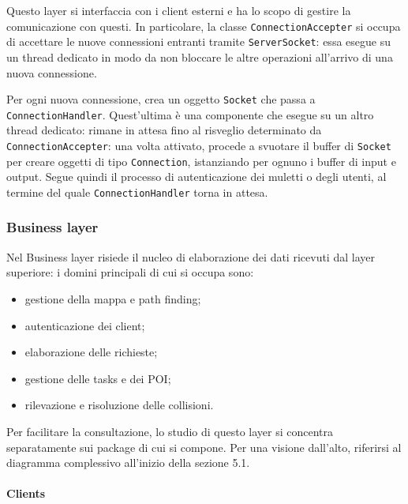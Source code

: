 Questo layer si interfaccia con i client esterni e ha lo scopo di gestire la comunicazione con questi. In particolare, la classe \texttt{ConnectionAccepter} si occupa di accettare le nuove connessioni entranti tramite \texttt{ServerSocket}: essa esegue su un thread dedicato in modo da non bloccare le altre operazioni all'arrivo di una nuova connessione.

Per ogni nuova connessione, crea un oggetto \texttt{Socket} che passa a \texttt{ConnectionHandler}. Quest'ultima è una componente che esegue su un altro thread dedicato: rimane in attesa fino al risveglio determinato da \texttt{ConnectionAccepter}: una volta attivato, procede a svuotare il buffer di \texttt{Socket} per creare oggetti di tipo \texttt{Connection}, istanziando per ognuno i buffer di input e output. Segue quindi il processo di autenticazione dei muletti o degli utenti, al termine del quale \texttt{ConnectionHandler} torna in attesa.







\subsubsection{Business layer}

Nel Business layer risiede il nucleo di elaborazione dei dati ricevuti dal layer superiore: i domini principali di cui si occupa sono:
\begin{itemize}
	\item gestione della mappa e path finding;
	\item autenticazione dei client;
    \item elaborazione delle richieste;
	\item gestione delle tasks e dei POI;
	\item rilevazione e risoluzione delle collisioni.
\end{itemize}
Per facilitare la consultazione, lo studio di questo layer si concentra separatamente sui package di cui si compone. Per una visione dall'alto, riferirsi al diagramma complessivo all'inizio della sezione 5.1.



\clearpage
\paragraph{Clients}
\subparagraph*{ }

